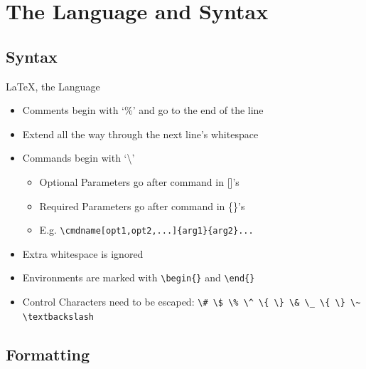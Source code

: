 \documentclass{beamer}
\begin{document}
\section{The Language and Syntax}

\subsection {Syntax}

\begin{frame}[fragile]{\LaTeX, the Language}
  \begin{itemize}
    \item
      Comments begin with `\%' and go to the end of the line
    \item
      Extend all the way through the next line's whitespace
    \item
      Commands begin with `\textbackslash'
    \begin{itemize}
      \item
        Optional Parameters go after command in []'s
      \item
        Required Parameters go after command in \{\}'s
      \item
        E.g. \verb|\cmdname[opt1,opt2,...]{arg1}{arg2}...|
    \end{itemize}
    \item
      Extra whitespace is ignored
    \item
      Environments are marked with \verb|\begin{}| and \verb|\end{}|
    \item
      Control Characters need to be escaped:
      \verb|\# \$ \% \^ \{ \} \& \_ \{ \} \~ \textbackslash|
  \end{itemize}
\end{frame}

\subsection {Formatting}
\end{document}
